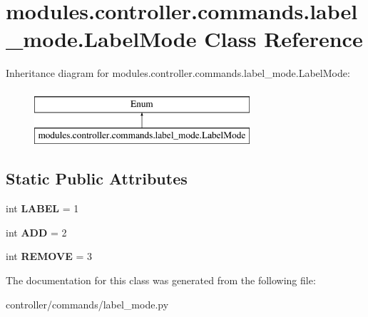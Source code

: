 \hypertarget{classmodules_1_1controller_1_1commands_1_1label__mode_1_1_label_mode}{}\section{modules.\+controller.\+commands.\+label\+\_\+mode.\+Label\+Mode Class Reference}
\label{classmodules_1_1controller_1_1commands_1_1label__mode_1_1_label_mode}
Inheritance diagram for modules.\+controller.\+commands.\+label\+\_\+mode.\+Label\+Mode\+:\begin{figure}[H]
\begin{center}
\leavevmode
\includegraphics[height=2.000000cm]{classmodules_1_1controller_1_1commands_1_1label__mode_1_1_label_mode}
\end{center}
\end{figure}
\subsection*{Static Public Attributes}
\begin{DoxyCompactItemize}
\item 
\mbox{\label{classmodules_1_1controller_1_1commands_1_1label__mode_1_1_label_mode_a3445fc4e2d7ec561611eb9e4471b3ffa}} 
int {\bfseries L\+A\+B\+EL} = 1
\item 
\mbox{\label{classmodules_1_1controller_1_1commands_1_1label__mode_1_1_label_mode_a46679913f9bddb670f0f2ae1b80254a0}} 
int {\bfseries A\+DD} = 2
\item 
\mbox{\label{classmodules_1_1controller_1_1commands_1_1label__mode_1_1_label_mode_a8fa12d780974a25de1fe50231c56ec89}} 
int {\bfseries R\+E\+M\+O\+VE} = 3
\end{DoxyCompactItemize}


The documentation for this class was generated from the following file\+:\begin{DoxyCompactItemize}
\item 
controller/commands/label\+\_\+mode.\+py\end{DoxyCompactItemize}
